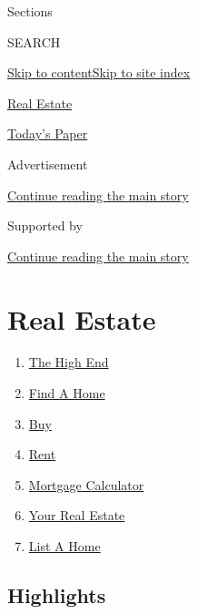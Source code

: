 Sections

SEARCH

\protect\hyperlink{site-content}{Skip to
content}\protect\hyperlink{site-index}{Skip to site index}

\href{https://www.nytimes.com/section/realestate}{Real Estate}

\href{https://myaccount.nytimes.com/auth/login?response_type=cookie\&client_id=vi}{}

\href{https://www.nytimes.com/section/todayspaper}{Today's Paper}

Advertisement

\protect\hyperlink{after-top}{Continue reading the main story}

Supported by

\protect\hyperlink{after-sponsor}{Continue reading the main story}

\hypertarget{real-estate}{%
\section{Real Estate}\label{real-estate}}

\begin{enumerate}
\def\labelenumi{\arabic{enumi}.}
\tightlist
\item
  \href{/realestate/the-high-end}{The High End}
\item
  \href{/real-estate/find-a-home}{Find A Home}
\item
  \href{/real-estate/homes-for-sale}{Buy}
\item
  \href{/real-estate/homes-for-rent}{Rent}
\item
  \href{/real-estate/mortgage-calculator}{Mortgage Calculator}
\item
  \href{/real-estate/my-real-estate}{Your Real Estate}
\item
  \href{https://nytimesads.gtspayments.com/}{List A Home}
\end{enumerate}

\hypertarget{highlights}{%
\subsection{Highlights}\label{highlights}}

